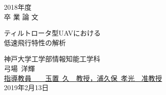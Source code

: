 \newcommand{\hdate}[1]{\setcounter{page}{0}\begin{center}{\LARGE
#1\\}\vskip 20pt {\Huge 卒 業 論 文}\end{center}\vskip 40pt}

\newcommand{\htitle}[1]{
        \begin{center}
                \vskip 16pt
                {\LARGE #1}\\
                \setlength{\unitlength}{1mm}
        \end{center}
        \vskip 40pt
}

\begin{titlepage}
\vspace*{2cm}
\hdate{2018年度}
\htitle{ティルトロータ型UAVにおける\\低速飛行特性の解析}

\hspace{8cm}
\begin{center}
\Large
神戸大学工学部情報知能工学科\\
\vskip 20pt
弓場~洋輝\\
\vskip 40pt
\underline{指導教員~~~~{\Large 玉置~久~~教授，浦久保~孝光~~准教授}}\\
\vskip 20pt
2019年2月13日
\end{center}
\end{titlepage}
